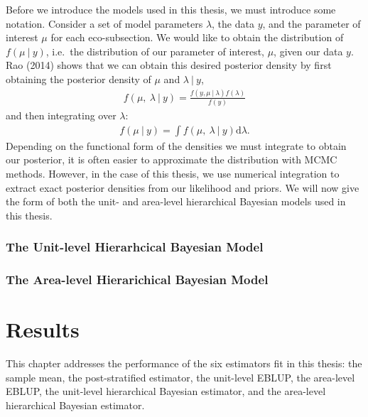 \documentclass[12pt,twoside]{reedthesis}
\begin{document}
Before we introduce the models used in this thesis, we must introduce some notation. Consider a set of model parameters \(\lambda\), the data \(y\), and the parameter of interest \(\mu\) for each eco-subsection. We would like to obtain the distribution of \(f(\mu ~\vert~ y)\), i.e.~the distribution of our parameter of interest, \(\mu\), given our data \(y\). Rao (2014) shows that we can obtain this desired posterior density by first obtaining the posterior density of \(\mu\) and \(\lambda ~\vert~ y\),
\begin{align}
f(\mu,~ \lambda ~\vert~ y) = \frac{f(y, \mu ~\vert~ \lambda) f(\lambda)}{f(y)}
\end{align}
and then integrating over \(\lambda\):
\begin{align}
f(\mu ~\vert~ y) = \int f(\mu,~ \lambda ~\vert~ y) \text{d}\lambda.
\end{align}
Depending on the functional form of the densities we must integrate to obtain our posterior, it is often easier to approximate the distribution with MCMC methods. However, in the case of this thesis, we use numerical integration to extract exact posterior densities from our likelihood and priors. We will now give the form of both the unit- and area-level hierarchical Bayesian models used in this thesis.

\hypertarget{the-unit-level-hierarhcical-bayesian-model}{%
\subsection{The Unit-level Hierarhcical Bayesian Model}\label{the-unit-level-hierarhcical-bayesian-model}}

\hypertarget{the-area-level-hierarichical-bayesian-model}{%
\subsection{The Area-level Hierarichical Bayesian Model}\label{the-area-level-hierarichical-bayesian-model}}

\hypertarget{results}{%
\chapter{Results}\label{results}}

This chapter addresses the performance of the six estimators fit in this thesis: the sample mean, the post-stratified estimator, the unit-level EBLUP, the area-level EBLUP, the unit-level hierarchical Bayesian estimator, and the area-level hierarchical Bayesian estimator.
\end{document}
